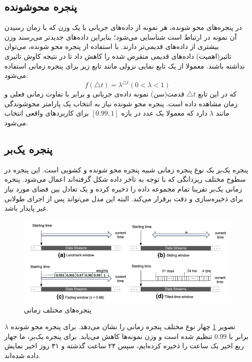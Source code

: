 \subsection{پنجره محوشونده}
در پنجره‌های محو شونده، هر نمونه از داده‌های جریانی با یک وزن که با زمان رسیدن آن نمونه در ارتباط است شناسایی می‌شود؛ بنابراین داده‌های جدیدتر می‌رسند وزن بیشتری از داده‌های قدیمی‌تر دارند\cite{leite2009evolving}. با استفاده از پنجره محو شونده، می‌توان تاثیر(اهمیت) داده‌های قدیمی منقرض شده را کاهش داد تا در نتیجه کاوش تاثیری نداشته باشند. معمولا از یک تابع نمایی نزولی مانند تابع زیر برای پنجره زمانی استفاده می‌شود:
$$
f(\triangle t) = \lambda^{\triangle t}(0 < \lambda < 1)
$$
که در این تابع $\triangle t$ قدمت(سن) نمونه داده‌ی جریانی و برابر با تفاوت زمانی فعلی و زمان مشاهده داده است. پنجره محو شونده نیاز به انتخاب یک پارامتر محوشوندگی مانند $ \lambda $ دارد که معمولا یک عدد در بازه $ [0.99, 1] $ برای کاربردهای واقعی انتخاب می‌شود\cite{Nguyen2015}.


\subsection{پنجره یک‌بر}
پنجره یک‌بر یک نوع پنجره زمانی شبیه پنجره محو شونده و کشویی است\cite{aggarwal2006framework}. این پنجره در سطوح مختلف ریزدانگی که با توجه به تاخر داده شکل گرفته‌اند اعمال می‌شود. پنجره زمانی‌ یک‌بر تقریبا تمام مجموعه داده را ذخیره کرده و یک تعادل بین فضای مورد نیاز برای ذخیره‌سازی و دقت برقرار می‌کند. البته این‌ مدل می‌تواند پس از اجرای طولانی غیر پایدار باشد.



\begin{figure}%
\centerline{\includegraphics[width=15cm]{time-windows}}
\caption{پنجره‌های مختلف زمانی}
\label{fig:time-windows}
\end{figure}
تصویر
\ref{fig:time-windows}\cite{Nguyen2015}
چهار نوع مختلف پنجره زمانی را نشان می‌دهد. برای پنجره محو شونده $\lambda$ برابر با $0.99$ تنظیم شده است و وزن نمونه‌ها کاهش می‌یابد. برای پنجره یک‌بر، ما جهار ربع اخیر یک ساعت را ذخیره کرده‌ایم، سپس ۲۴ ساعت گذشته و ۳۱ روز اخیر نمایش داده شده‌اند.



